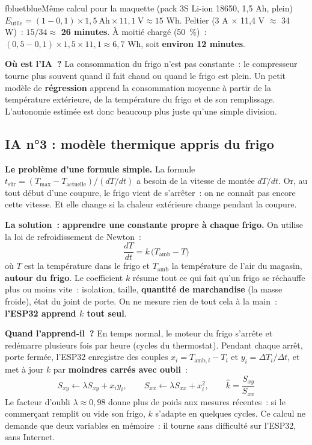 \documentclass[10pt,a4paper]{article}
\begin{document}
\begin{tbox}{fblue}{tblue}{Même calcul pour la maquette (pack 3S Li-ion 18650, 1,5 Ah, plein)}
$E_{\text{utile}} = (1 - 0{,}1) \times 1{,}5\ \text{Ah} \times 11{,}1\ \text{V} \approx 15$ Wh. Peltier (3 A $\times$ 11,4 V $\approx$ 34 W)~: $15/34 \approx$ \textbf{26 minutes}. À moitié chargé (50~\%)~: $(0{,}5 - 0{,}1) \times 1{,}5 \times 11{,}1 \approx 6{,}7$ Wh, soit \textbf{environ 12 minutes}.
\end{tbox}

\textbf{Où est l'IA~?} La consommation du frigo n'est pas constante~: le compresseur tourne plus souvent quand il fait chaud ou quand le frigo est plein. Un petit modèle de \textbf{régression} apprend la consommation moyenne à partir de la température extérieure, de la température du frigo et de son remplissage. L'autonomie estimée est donc beaucoup plus juste qu'une simple division.

\subsection{IA n°3 : modèle thermique appris du frigo}
\textbf{Le problème d'une formule simple.} La formule $t_{\text{sûr}} = (T_{\max} - T_{\text{actuelle}})/(dT/dt)$ a besoin de la vitesse de montée $dT/dt$. Or, au tout début d'une coupure, le frigo vient de s'arrêter~: on ne connaît pas encore cette vitesse. Et elle change si la chaleur extérieure change pendant la coupure.

\textbf{La solution~: apprendre une constante propre à chaque frigo.} On utilise la loi de refroidissement de Newton~:
\[ \frac{dT}{dt} = k\,\bigl(T_{\text{amb}} - T\bigr) \]
où $T$ est la température dans le frigo et $T_{\text{amb}}$ la température de l'air du magasin, \textbf{autour du frigo}.
Le coefficient $k$ résume tout ce qui fait qu'un frigo se réchauffe plus ou moins vite~: isolation, taille, \textbf{quantité de marchandise} (la masse froide), état du joint de porte. On ne mesure rien de tout cela à la main~: \textbf{l'ESP32 apprend $k$ tout seul}.

\textbf{Quand l'apprend-il~?} En temps normal, le moteur du frigo s'arrête et redémarre plusieurs fois par heure (cycles du thermostat). Pendant chaque arrêt, porte fermée, l'ESP32 enregistre des couples $x_i = T_{\text{amb},i} - T_i$ et $y_i = \Delta T_i / \Delta t$, et met à jour $k$ par \textbf{moindres carrés avec oubli}~:
\[ S_{xy} \leftarrow \lambda S_{xy} + x_i y_i, \qquad S_{xx} \leftarrow \lambda S_{xx} + x_i^2, \qquad \hat{k} = \frac{S_{xy}}{S_{xx}} \]
Le facteur d'oubli $\lambda \approx 0{,}98$ donne plus de poids aux mesures récentes~: si le commerçant remplit ou vide son frigo, $k$ s'adapte en quelques cycles. Ce calcul ne demande que deux variables en mémoire~: il tourne sans difficulté sur l'ESP32, sans Internet.
\end{document}
